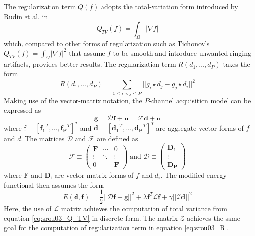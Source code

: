 \documentclass[12pt,notitlepage]{report}
\begin{document}
The regularization term $Q(f)$ adopts the total-variation form introduced by Rudin et al. in \cite{rudi92}
\begin{equation}
\label{eq:srou03_Q_TV}
	Q_{TV}(f) = \int_{\Omega}{} |\nabla f| 	
\end{equation}
which, compared to other forms of regularization such as Tichonov's $Q_{TV}(f) = \int_{\Omega}{} |\nabla f|^2$ that assume $f$ to be smooth and introduce unwanted ringing artifacts, provides better results. 
The regularization term $R(d_1, \dots, d_P)$ takes the form 
\begin{equation}
\label{eq:srou03_R}
	R(d_1, \dots, d_P) = \sum_{1 \leq i < j \leq P}^{} || g_i \star d_j - g_j \star d_i ||^2 	
\end{equation}
Making use of the vector-matrix notation, the $P$-channel acquisition model can be expressed as 
\begin{equation}
\label{eq:srou03_general_model_vec}
	\mathbf{g} = \mathcal{D}\mathbf{f} + \mathbf{n} = \mathcal{F}\mathbf{d} + \mathbf{n} 	
\end{equation}
where $\mathbf{f} = [\mathbf{f_1}^T, \dots, \mathbf{f_P}^T]^T$ and $\mathbf{d} = [\mathbf{d_1}^T, \dots, \mathbf{d_P}^T]^T$ are aggregate vector forms of $f$ and $d$. The matrices $\mathcal{D}$ and $\mathcal{F}$ are defined as 
\begin{equation}
\label{eq:srou03_general_model_vec}
	\mathcal{F} \equiv \begin{pmatrix} \mathbf{F} & \cdots & 0 \\ \vdots & \ddots & \vdots \\ 0 & \cdots & \mathbf{F} \end{pmatrix} \text{ and } \mathcal{D} \equiv \begin{pmatrix} \mathbf{D_1} \\ \vdots \\ \mathbf{D_P} \end{pmatrix}  	
\end{equation}
where $\mathbf{F}$ and $\mathbf{D_i}$ are vector-matrix forms of $f$ and $d_i$. The modified energy functional then assumes the form
\begin{equation}
\label{eq:srou03_energy_vec}
	E(\mathbf{d},\mathbf{f}) = \frac{1}{2}||\mathcal{D}\mathbf{f} - \mathbf{g}||^2 + \lambda  \mathbf{f}^T \mathcal{L} \mathbf{f} + \gamma ||\mathcal{Z} \mathbf{d}||^2 	
\end{equation}
Here, the use of $\mathcal{L}$ matrix achieves the computation of total variance from equation \ref{eq:srou03_Q_TV} in discrete form. The matrix $\mathcal{Z}$ achieves the same goal for the computation of regularization term in equation \ref{eq:srou03_R}. 
\end{document}
